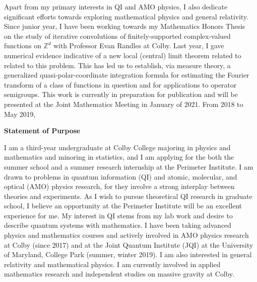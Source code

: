 \documentclass[12pt]{article}
\begin{document}
Apart from my primary interests in QI and AMO physics, I also dedicate significant efforts towards exploring mathematical physics and general relativity. Since junior year, I have been working towards my Mathematics Honors Thesis on the study of iterative convolutions of finitely-supported complex-valued functions on $\mathbb{Z}^d$ with Professor Evan Randles at Colby. Last year, I gave numerical evidence indicative of a new local (central) limit theorem related to related to this problem. This has led us to establish, via measure theory, a generalized quasi-polar-coordinate integration formula for estimating the Fourier transform of a class of functions in question and for applications to operator semigroups. This work is currently in preparation for publication and will be presented at the Joint Mathematics Meeting in January of 2021. From 2018 to May 2019, 






 


	
	
	
	
	
	
	

\newpage	
	
	
\begin{center}
	\textbf{Statement of Purpose}
\end{center}
	

\noindent I am a third-year undergraduate at Colby College majoring in physics and mathematics and minoring in statistics, and I am applying for the both the summer school and a summer research internship at the Perimeter Institute. I am drawn to problems in quantum information (QI) and atomic, molecular, and optical (AMO) physics research, for they involve a strong interplay between theories and experiments. As I wish to pursue theoretical QI research in graduate school, I believe an opportunity at the Perimeter Institute will be an excellent experience for me. My interest in QI stems from my lab work and desire to describe quantum systems with mathematics. I have been taking advanced physics and mathematics courses and actively involved in AMO physics research at Colby (since 2017) and at the Joint Quantum Institute (JQI) at the University of Maryland, College Park (summer, winter 2019). I am also interested in general relativity and mathematical physics. I am currently involved in applied mathematics research and independent studies on massive gravity at Colby.   \\
\end{document}
